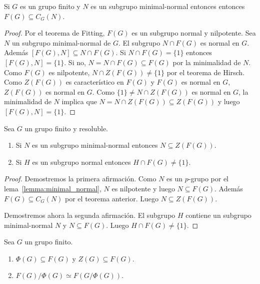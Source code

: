 \begin{theorem}
	\label{theorem:F(G)centraliza}
	Si $G$ es un grupo finito y $N$ es un subgrupo minimal-normal entonces
	entonces $F(G)\subseteq C_G(N)$.
\end{theorem}

\begin{proof}
	Por el teorema de Fitting, $F(G)$ es un subgrupo normal y nilpotente. 
	Sea $N$ un subgrupo minimal-normal de $G$. 
	El subgrupo $N\cap F(G)$
	es normal en $G$.  Además $[F(G),N]\subseteq N\cap F(G)$. Si $N\cap F(G)=\{1\}$ entonces
	$[F(G),N]=\{1\}$. Si no, $N=N\cap F(G)\subseteq F(G)$ por la minimalidad de $N$. Como
	$F(G)$ es nilpotente, $N\cap Z(F(G))\ne \{1\}$ por el
	teorema de Hirsch. 
	Como $Z(F(G))$ es característico en $F(G)$ y
	$F(G)$ es normal en $G$, $Z(F(G))$ es normal en $G$. Como $\{1\}\ne N\cap Z(F(G))$ es
	normal en $G$, la minimalidad de $N$ implica que $N=N\cap Z(F(G))\subseteq
	Z(F(G))$ y luego $[F(G),N]=\{1\}$. 
\end{proof}

\begin{corollary}
	Sea $G$ un grupo finito y resoluble. 
	\begin{enumerate}
		\item Si $N$ es un subgrupo minimal-normal entonces $N\subseteq
			Z(F(G))$. 
		\item Si $H$ es un subgrupo normal entonces $H\cap F(G)\ne\{1\}$.
	\end{enumerate}
\end{corollary}

\begin{proof}
	Demostremos la primera afirmación. Como $N$ es un $p$-grupo por el
	lema~\ref{lemma:minimal_normal}, $N$ es nilpotente y luego $N\subseteq
	F(G)$. 	Además $F(G)\subseteq C_G(N)$ por el
	teorema anterior.  Luego $N\subseteq Z(F(G))$. 

	Demostremos ahora la segunda afirmación. El subgrupo $H$ contiene un
	subgrupo minimal-normal $N$ y $N\subseteq F(G)$. Luego $H\cap F(G)\ne\{1\}$. 
\end{proof}

\begin{theorem}
	Sea $G$ un grupo finito.
	\begin{enumerate}
		\item $\Phi(G)\subseteq F(G)$ y $Z(G)\subseteq F(G)$.
		\item $F(G)/\Phi(G)\simeq F(G/\Phi(G))$.
	\end{enumerate}
\end{theorem}

